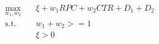 \documentclass{article}
\begin{document}
\begin{equation}
\begin{aligned}
\max_{w_1,w_2} \quad & \xi + w_1RPC+w_2CTR + D_1 + D_2\\
\textrm{s.t.} \quad & w_1 + w_2 >= 1\\
  &\xi > 0    \\
\end{aligned}
\end{equation}
\end{document}
